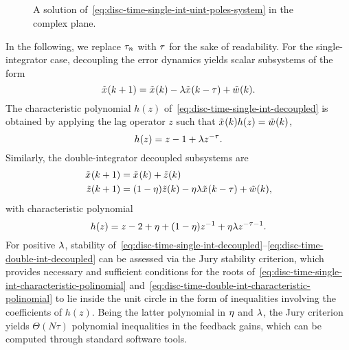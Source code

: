 
\subsection{}\label{app:disc-time-single-int-stability}

\begin{figure}
	\centering
	
	\caption{A solution of~\eqref{eq:disc-time-single-int-uint-poles-system} in the complex plane.}
	\label{fig:disc-time-single-int-unit-poles}
\end{figure}

In the following, we replace $ \tau_n $ with $ \tau $ %
for the sake of readability.
For the single-integrator case, decoupling the error dynamics yields scalar subsystems of the form
\begin{equation}\label{eq:disc-time-single-int-decoupled}
	\tilde{x}_{}(k+1) = \tilde{x}_{}(k) - \lambda\tilde{x}_{}(k-\tau) + \tilde{w}_{}(k).
\end{equation}
The characteristic polynomial $ h(z) $ of~\eqref{eq:disc-time-single-int-decoupled} is obtained by
applying the lag operator $ z $
such that $ \tilde{x}_{}(k)h(z) = \tilde{w}_{}(k) $,
\begin{equation}\label{eq:disc-time-single-int-characteristic-polinomial}
	h(z) = z - 1 + \lambda z^{-\tau}.
\end{equation}
Similarly, the double-integrator decoupled subsystems are
\begin{equation}\label{eq:disc-time-double-int-decoupled}
	\begin{aligned}
		\tilde{x}_{}(k+1) &= \tilde{x}_{}(k) + \tilde{z}_{}(k)\\
		\tilde{z}_{}(k+1) &= (1-\eta)\tilde{z}_{}(k) - \eta\lambda\tilde{x}_{}(k-\tau) + \tilde{w}_{}(k),
	\end{aligned}
\end{equation}
with characteristic polynomial
\begin{equation}\label{eq:disc-time-double-int-characteristic-polinomial}
	h(z) = z-2+\eta+(1-\eta)z^{-1}+\eta\lambda z^{-\tau-1}.
\end{equation}
For positive $ \lambda $, stability of~\eqref{eq:disc-time-single-int-decoupled}--\eqref{eq:disc-time-double-int-decoupled}
can be assessed via the Jury stability criterion,
which provides necessary and sufficient conditions for
the roots of~\eqref{eq:disc-time-single-int-characteristic-polinomial} and~\eqref{eq:disc-time-double-int-characteristic-polinomial}
to lie inside the unit circle %
in the form of inequalities involving the coefficients of $ h(z) $.
Being the latter polynomial in $ \eta $ and $ \lambda $,
the Jury criterion %
yields $ \Theta(N\tau) $ polynomial inequalities in the feedback gains,
which can be computed through standard software tools.

